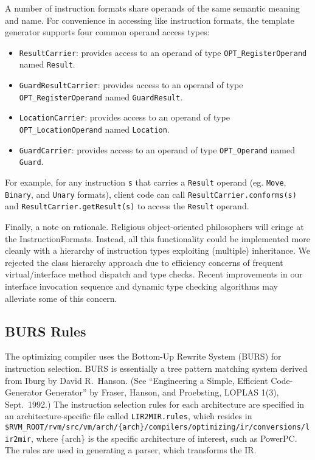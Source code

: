 A number of instruction formats share operands of 
the same semantic meaning and name.  For convenience in accessing
like instruction formats, the template generator supports four
common operand access types:
\begin{itemize}
\item {\tt ResultCarrier}: provides access to an operand of type {\tt OPT\_RegisterOperand} named {\tt Result}.
\item {\tt GuardResultCarrier}: provides access to an operand of type {\tt OPT\_RegisterOperand} named {\tt GuardResult}.
\item {\tt LocationCarrier}: provides access to an operand of type {\tt OPT\_LocationOperand} named {\tt Location}.
\item {\tt GuardCarrier}: provides access to an operand of type {\tt OPT\_Operand} named {\tt Guard}.
\end{itemize}

For example, for any instruction {\tt s} that carries a {\tt Result} operand
(eg. {\tt Move}, {\tt Binary}, and {\tt Unary} formats), client code can call
{\tt ResultCarrier.conforms(s)} and {\tt ResultCarrier.getResult(s)} to access
the {\tt Result} operand.

Finally, a note on rationale.  Religious object-oriented philosophers
will cringe at the InstructionFormats.  Instead, all this
functionality could be implemented more cleanly with a hierarchy of
instruction types exploiting (multiple) inheritance.  We rejected the
class hierarchy approach due to efficiency concerns of frequent
virtual/interface method dispatch and type checks.  Recent
improvements in our interface invocation sequence and dynamic type
checking algorithms may alleviate some of this concern.

\subsection{BURS Rules}\label{burs}

The optimizing compiler uses the Bottom-Up Rewrite System (BURS) for
instruction selection.  BURS is essentially a tree pattern matching
system derived from Iburg by David R.\ Hanson.   (See ``Engineering a
Simple, Efficient Code-Generator Generator'' by Fraser, Hanson, and
Proebsting, LOPLAS 1(3), Sept.\ 1992.)
The instruction selection rules for each architecture are specified in an
architecture-specific file called {\tt LIR2MIR.rules}, which resides in
{\tt \$RVM\_ROOT/rvm/src/vm/arch/\{arch\}/compilers/optimizing/ir/conversions/lir2mir}, where \{arch\} is the
specific architecture of interest, such as PowerPC\TMweb.
The rules are 
used in generating a parser, which transforms the IR.

